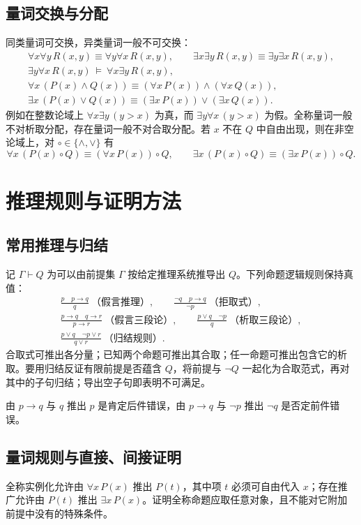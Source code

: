 \documentclass[../main.tex]{subfiles}
\begin{document}
\subsection{量词交换与分配}
同类量词可交换，异类量词一般不可交换：
\begin{gather*}
\forall x\forall y\,R(x,y)\equiv\forall y\forall x\,R(x,y),\qquad
\exists x\exists y\,R(x,y)\equiv\exists y\exists x\,R(x,y),\\
\exists y\forall x\,R(x,y)\ \models\ \forall x\exists y\,R(x,y),\\
\forall x\,(P(x)\land Q(x))\equiv(\forall x\,P(x))\land(\forall x\,Q(x)),\\
\exists x\,(P(x)\lor Q(x))\equiv(\exists x\,P(x))\lor(\exists x\,Q(x)).
\end{gather*}
例如在整数论域上 $\forall x\exists y\,(y>x)$ 为真，而 $\exists y\forall x\,(y>x)$ 为假。全称量词一般不对析取分配，存在量词一般不对合取分配。若 $x$ 不在 $Q$ 中自由出现，则在非空论域上，对 $\circ\in\{\land,\lor\}$ 有
\[
\forall x\,(P(x)\circ Q)\equiv(\forall x\,P(x))\circ Q,\qquad
\exists x\,(P(x)\circ Q)\equiv(\exists x\,P(x))\circ Q.
\]

\section{推理规则与证明方法}
\subsection{常用推理与归结}
记 $\Gamma\vdash Q$ 为可以由前提集 $\Gamma$ 按给定推理系统推导出 $Q$。下列命题逻辑规则保持真值：
\begin{gather*}
\frac{p\quad p\to q}{q}\ \text{（假言推理）},\qquad
\frac{\neg q\quad p\to q}{\neg p}\ \text{（拒取式）},\\
\frac{p\to q\quad q\to r}{p\to r}\ \text{（假言三段论）},\qquad
\frac{p\lor q\quad\neg p}{q}\ \text{（析取三段论）},\\
\frac{p\lor q\quad\neg p\lor r}{q\lor r}\ \text{（归结规则）}.
\end{gather*}
合取式可推出各分量；已知两个命题可推出其合取；任一命题可推出包含它的析取。要用归结反证有限前提是否蕴含 $Q$，将前提与 $\neg Q$ 一起化为合取范式，再对其中的子句归结；导出空子句即表明不可满足。

由 $p\to q$ 与 $q$ 推出 $p$ 是肯定后件错误，由 $p\to q$ 与 $\neg p$ 推出 $\neg q$ 是否定前件错误。

\subsection{量词规则与直接、间接证明}
全称实例化允许由 $\forall x\,P(x)$ 推出 $P(t)$，其中项 $t$ 必须可自由代入 $x$；存在推广允许由 $P(t)$ 推出 $\exists x\,P(x)$。证明全称命题应取任意对象，且不能对它附加前提中没有的特殊条件。
\end{document}
